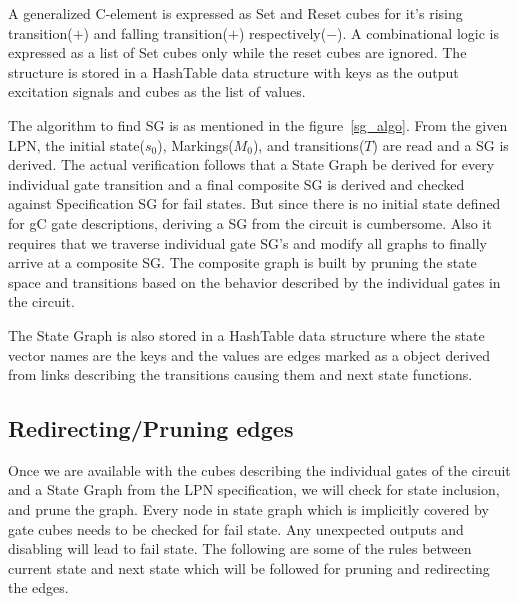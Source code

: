 \documentclass[10pt,journal,compsoc]{IEEEtran}
\begin{document}
A generalized C-element is expressed as Set and Reset cubes for it's rising transition($+$) and falling transition($+$) respectively($-$). A combinational logic is expressed as a list of Set cubes only while the reset cubes are ignored. The structure is stored in a HashTable data structure with keys as the output excitation signals and cubes as the list of values. 

The algorithm to find SG is as mentioned in the figure~\ref{sg_algo}. 
From the given LPN, the initial state($s_0$), Markings($M_0$), and transitions($T$) are read and a SG is derived. 
The actual verification follows that a State Graph be derived for every individual gate transition and a final composite SG is derived and checked against Specification SG for fail states.
But since there is no initial state defined for gC gate descriptions, deriving a SG from the circuit is cumbersome. Also it requires that we traverse individual gate SG's and modify all graphs to finally arrive at a composite SG.
The composite graph is built by pruning
the state space and transitions based on the behavior described by the individual gates in the circuit.

The State Graph is also stored in a HashTable data structure where the state vector names are the keys and the values are edges marked as a object derived from links describing the transitions causing them and next state functions.

\subsection{Redirecting/Pruning edges}
Once we are available with the cubes describing the individual gates of the circuit and a State Graph from the LPN specification, we will check for state inclusion, and prune the graph.
Every node in state graph which is implicitly covered by gate cubes needs to be checked for fail state. Any unexpected outputs and disabling
will lead to fail state. The following are some of the rules between current state and next state which will be followed for pruning and redirecting the edges.
\end{document}
